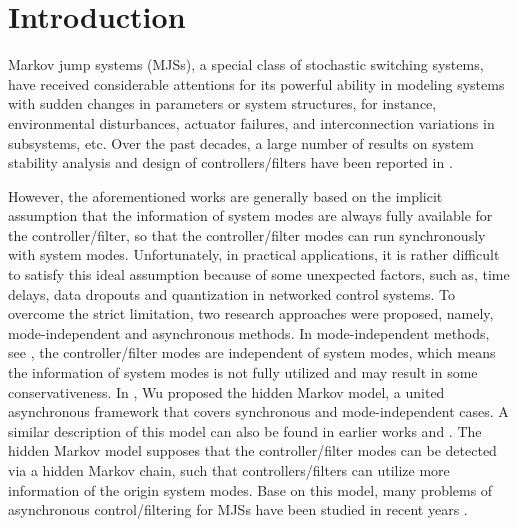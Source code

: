 \documentclass[journal,final,twocolumn]{IEEEtran}
\begin{document}
%
\IEEEpeerreviewmaketitle
  
   

\section{Introduction}
	Markov jump systems (MJSs), a special class of stochastic switching systems, have received considerable attentions for its powerful ability in modeling systems with sudden changes in parameters or system structures, for instance,  environmental disturbances, actuator failures, and interconnection variations in subsystems, etc. Over the past decades, a large number of results on system stability analysis and  design of controllers/filters have been reported in \cite{costa2006discrete, wu2014asynchronous, zhang2008analysis, shi2006designing, zhang2009stability}.
	
	However, the aforementioned works  are generally based on the implicit assumption that the information of system modes are always  fully available for the controller/filter, so that the controller/filter modes can run synchronously with system modes. Unfortunately, in practical applications, it is rather difficult to satisfy this ideal assumption because of some unexpected factors, such as, time delays, data dropouts and quantization in networked control systems. To overcome the strict limitation, two research approaches were proposed, namely, mode-independent and asynchronous methods. In mode-independent methods, see \cite{todorov2016new,wu2005mode,dolgov2017static}, the controller/filter modes are independent of system modes, which means the information of system modes is not fully utilized and may result in some conservativeness. In \cite{wu2016passivity}, Wu proposed the hidden Markov model, a united asynchronous framework that covers synchronous and mode-independent cases. A similar description of this model can also be found in earlier works \cite{costa2006discrete} and \cite{do2014detector}. The hidden Markov model supposes that the controller/filter modes can be detected via a hidden Markov chain, such that controllers/filters can utilize more information of the origin system modes.  Base on this model, many problems of asynchronous control/filtering for MJSs have been studied in recent years \cite{de2017h,todorov2018detector,rodrigues2018detector}. 
	
\end{document}
